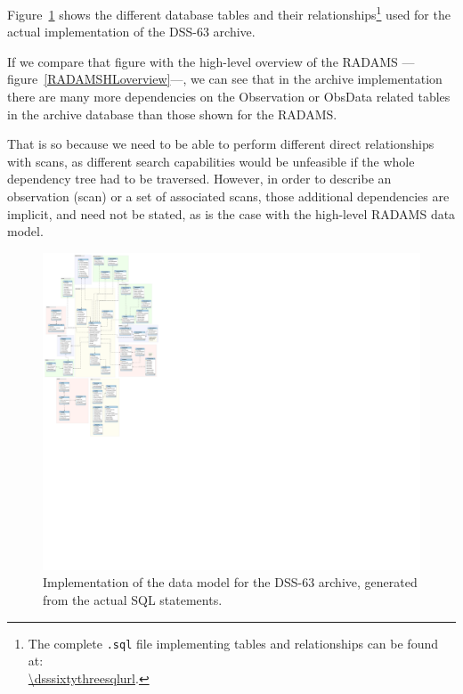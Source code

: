 			Figure~\ref{fig:fig_DSS63-data-model} shows the
			different database tables and their
			relationships\footnote {The complete \texttt{.sql} file
			implementing tables and relationships can be found
			at:\\ \url{\dsssixtythreesqlurl}.} used for the actual
			implementation of the DSS-63 archive.
			
			If we compare that figure with the high-level overview
			of the RADAMS ---figure~\ref{RADAMSHLoverview}---, we
			can see that in the archive implementation there are
			many more dependencies on the Observation or ObsData
			related tables in the archive database than those shown
			for the RADAMS.
			
			That is so because we need to be able to perform
			different direct relationships with scans, as different
			search capabilities would be unfeasible if the whole
			dependency tree had to be traversed. However, in order
			to describe an observation (scan) or a set of
			associated scans, those additional dependencies are
			implicit, and need not be stated, as is the case with
			the high-level RADAMS data model.
			
			
			\begin{figure}[tbp]
				\centering
					\includegraphics[totalheight=1.1\textheight]
					{fig/DSS63-dm.pdf}
				\caption[Implementation of the data model for the
				DSS-63 archive]
				{
					Implementation of the data model for the
					DSS-63 archive, generated from the actual
					SQL  statements.
				}
				\label{fig:fig_DSS63-data-model}
			\end{figure}
			
